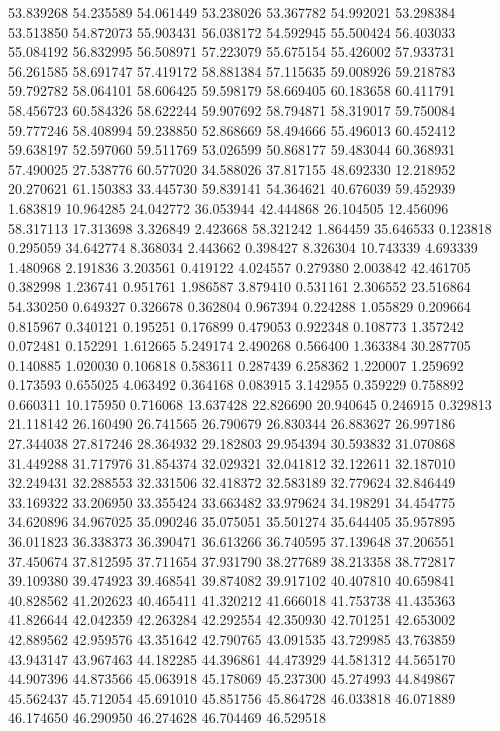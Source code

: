 53.839268
54.235589
54.061449
53.238026
53.367782
54.992021
53.298384
53.513850
54.872073
55.903431
56.038172
54.592945
55.500424
56.403033
55.084192
56.832995
56.508971
57.223079
55.675154
55.426002
57.933731
56.261585
58.691747
57.419172
58.881384
57.115635
59.008926
59.218783
59.792782
58.064101
58.606425
59.598179
58.669405
60.183658
60.411791
58.456723
60.584326
58.622244
59.907692
58.794871
58.319017
59.750084
59.777246
58.408994
59.238850
52.868669
58.494666
55.496013
60.452412
59.638197
52.597060
59.511769
53.026599
50.868177
59.483044
60.368931
57.490025
27.538776
60.577020
34.588026
37.817155
48.692330
12.218952
20.270621
61.150383
33.445730
59.839141
54.364621
40.676039
59.452939
1.683819
10.964285
24.042772
36.053944
42.444868
26.104505
12.456096
58.317113
17.313698
3.326849
2.423668
58.321242
1.864459
35.646533
0.123818
0.295059
34.642774
8.368034
2.443662
0.398427
8.326304
10.743339
4.693339
1.480968
2.191836
3.203561
0.419122
4.024557
0.279380
2.003842
42.461705
0.382998
1.236741
0.951761
1.986587
3.879410
0.531161
2.306552
23.516864
54.330250
0.649327
0.326678
0.362804
0.967394
0.224288
1.055829
0.209664
0.815967
0.340121
0.195251
0.176899
0.479053
0.922348
0.108773
1.357242
0.072481
0.152291
1.612665
5.249174
2.490268
0.566400
1.363384
30.287705
0.140885
1.020030
0.106818
0.583611
0.287439
6.258362
1.220007
1.259692
0.173593
0.655025
4.063492
0.364168
0.083915
3.142955
0.359229
0.758892
0.660311
10.175950
0.716068
13.637428
22.826690
20.940645
0.246915
0.329813
21.118142
26.160490
26.741565
26.790679
26.830344
26.883627
26.997186
27.344038
27.817246
28.364932
29.182803
29.954394
30.593832
31.070868
31.449288
31.717976
31.854374
32.029321
32.041812
32.122611
32.187010
32.249431
32.288553
32.331506
32.418372
32.583189
32.779624
32.846449
33.169322
33.206950
33.355424
33.663482
33.979624
34.198291
34.454775
34.620896
34.967025
35.090246
35.075051
35.501274
35.644405
35.957895
36.011823
36.338373
36.390471
36.613266
36.740595
37.139648
37.206551
37.450674
37.812595
37.711654
37.931790
38.277689
38.213358
38.772817
39.109380
39.474923
39.468541
39.874082
39.917102
40.407810
40.659841
40.828562
41.202623
40.465411
41.320212
41.666018
41.753738
41.435363
41.826644
42.042359
42.263284
42.292554
42.350930
42.701251
42.653002
42.889562
42.959576
43.351642
42.790765
43.091535
43.729985
43.763859
43.943147
43.967463
44.182285
44.396861
44.473929
44.581312
44.565170
44.907396
44.873566
45.063918
45.178069
45.237300
45.274993
44.849867
45.562437
45.712054
45.691010
45.851756
45.864728
46.033818
46.071889
46.174650
46.290950
46.274628
46.704469
46.529518
